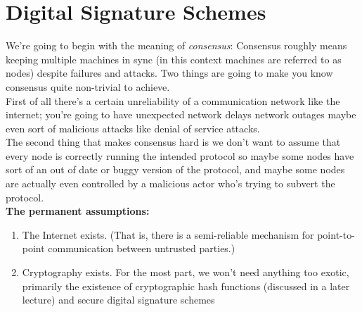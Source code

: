 \section{Digital Signature Schemes}
We're going to begin with the meaning of \textit{consensus}:
Consensus roughly means keeping multiple machines in sync (in this context machines are referred to as nodes) despite failures
and attacks. Two things are
going to make you know consensus quite
non-trivial to achieve. \\
First of
all there's a certain unreliability of a
communication network like the internet; you're going to have unexpected
network delays network outages
maybe even sort of malicious attacks
like denial of service attacks.\\
The second thing that makes consensus
hard is we don't want to assume that
every node is correctly running the
intended protocol so maybe some nodes
have sort of an out of date or buggy
version of the protocol, and maybe some nodes
are actually even controlled by a
malicious actor who's trying to subvert
the protocol.\\

\noindent
\textbf{The permanent assumptions:}
\begin{enumerate}
    \item The Internet exists. (That is, there is a semi-reliable mechanism for point-to-point
communication between untrusted parties.)
    \item Cryptography exists. For the most part, we won’t need anything too exotic, primarily
the existence of cryptographic hash functions (discussed in a later lecture) and secure
digital signature schemes 

\end{enumerate}
\newpage
